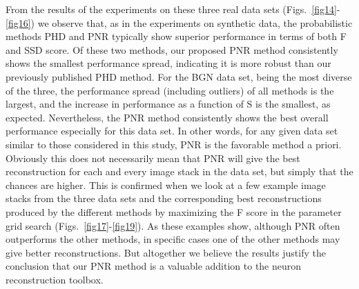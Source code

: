 From the results of the experiments on these three real data sets (Figs.~\ref{fig14}-\ref{fig16}) we observe that, as in the experiments on synthetic data, the probabilistic methods PHD and PNR typically show superior performance in terms of both F and SSD score. Of these two methods, our proposed PNR method consistently shows the smallest performance spread, indicating it is more robust than our previously published PHD method. For the BGN data set, being the most diverse of the three, the performance spread (including outliers) of all methods is the largest, and the increase in performance as a function of S is the smallest, as expected. Nevertheless, the PNR method consistently shows the best overall performance especially for this data set. In other words, for any given data set similar to those considered in this study, PNR is the favorable method a priori. Obviously this does not necessarily mean that PNR will give the best reconstruction for each and every image stack in the data set, but simply that the chances are higher. This is confirmed when we look at a few example image stacks from the three data sets and the corresponding best reconstructions produced by the different methods by maximizing the F score in the parameter grid search (Figs.~\ref{fig17}-\ref{fig19}). As these examples show, although PNR often outperforms the other methods, in specific cases one of the other methods may give better reconstructions. But altogether we believe the results justify the conclusion that our PNR method is a valuable addition to the neuron reconstruction toolbox.

